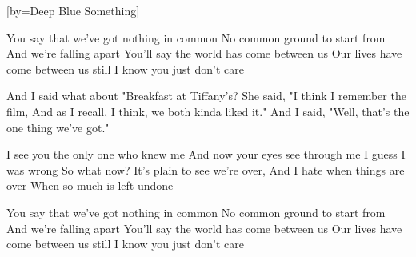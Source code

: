  

[by=Deep Blue Something]




\beginverse
You say that we've got nothing in common
No common ground to start from
And we're falling apart
You'll say the world has come between us
Our lives have come between us
still I know you just don't care
\endverse

\beginchorus
And I said what about "Breakfast at Tiffany's?
She said, "I think I remember the film,
And as I recall, I think, we both kinda liked it."
And I said, "Well, that's the one thing we've got."
\endchorus

\beginverse
I see you the only one who knew me
And now your eyes see through me
I guess I was wrong
So what now? It's plain to see we're over,
And I hate when things are over
When so much is left undone
\endverse

\beginverse
You say that we've got nothing in common
No common ground to start from
And we're falling apart
You'll say the world has come between us
Our lives have come between us
still I know you just don't care
\endverse




\endsong
